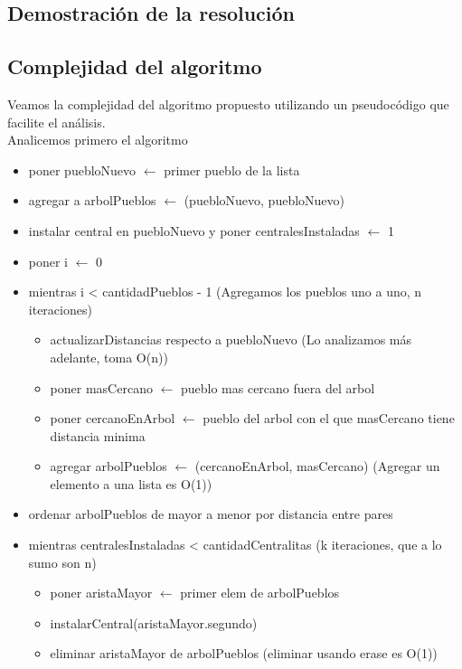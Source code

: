 \subsection{Demostraci\'on de la resoluci\'on}

\subsection{Complejidad del algoritmo}

Veamos la complejidad del algoritmo propuesto utilizando un pseudoc\'odigo que facilite el an\'alisis.\\

Analicemos primero el algoritmo\\

\begin{itemize}
\item poner puebloNuevo $\leftarrow$ primer pueblo de la lista
\item agregar a arbolPueblos $\leftarrow$ (puebloNuevo, puebloNuevo)
\item instalar central en puebloNuevo y poner centralesInstaladas $\leftarrow$ 1
\item poner i $\leftarrow$ 0
\item mientras i < cantidadPueblos - 1 (Agregamos los pueblos uno a uno, n iteraciones)
\begin{itemize}
	\item actualizarDistancias respecto a puebloNuevo (Lo analizamos m\'as adelante, toma O(n))
	\item poner masCercano $\leftarrow$ pueblo mas cercano fuera del arbol
	\item poner cercanoEnArbol $\leftarrow$ pueblo del arbol con el que masCercano tiene distancia minima
	\item agregar arbolPueblos $\leftarrow$ (cercanoEnArbol, masCercano) (Agregar un elemento a una lista es O(1))
\end{itemize}
\item ordenar arbolPueblos de mayor a menor por distancia entre pares 
\item mientras centralesInstaladas < cantidadCentralitas (k iteraciones, que a lo sumo son n)
\begin{itemize}
	\item poner aristaMayor $\leftarrow$ primer elem de arbolPueblos
	\item instalarCentral(aristaMayor.segundo)
	\item eliminar aristaMayor de arbolPueblos (eliminar usando erase es O(1))
\end{itemize}
\end{itemize}

